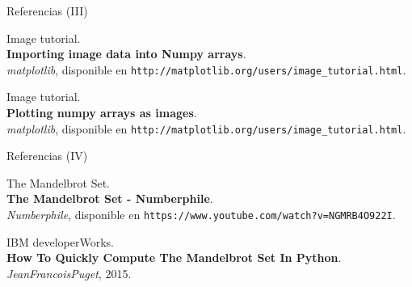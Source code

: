 \documentclass[usenames,dvipsnames]{beamer}
\begin{document}
  \begin{frame}{Referencias (III)}
    \begin{enumerate}[{[}1{]}]
      \addtocounter{enumi}{6}

      \item Image tutorial.\\
      \textbf{Importing image data into Numpy arrays}.\\
      \textit{matplotlib},
      disponible en \texttt{http://matplotlib.org/users/image\_tutorial.html}.

      \item Image tutorial.\\
      \textbf{Plotting numpy arrays as images}.\\
      \textit{matplotlib},
      disponible en \texttt{http://matplotlib.org/users/image\_tutorial.html}.
    \end{enumerate}
  \end{frame}

  \begin{frame}{Referencias (IV)}
    \begin{enumerate}[{[}1{]}]
      \addtocounter{enumi}{8}

      \item The Mandelbrot Set.\\
      \textbf{The Mandelbrot Set - Numberphile}.\\
      \textit{Numberphile},
      disponible en \texttt{https://www.youtube.com/watch?v=NGMRB4O922I}.

      \item IBM developerWorks.\\
      \textbf{How To Quickly Compute The Mandelbrot Set In Python}.\\
      \textit{JeanFrancoisPuget}, 2015.
    \end{enumerate}
  \end{frame}
\end{document}
